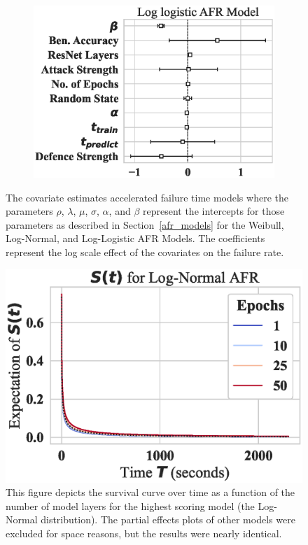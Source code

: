 \begin{figure}
\begin{subfigure}[t]{0.3\textwidth}
        \includegraphics[width=\textwidth]{cifar_log_logistic_aft.eps}
    \end{subfigure}

    \caption{The covariate estimates accelerated failure time models where the parameters $\rho$, $\lambda$, $\mu$, $\sigma$, $\alpha$, and $\beta$ represent the intercepts for those parameters as described in Section~\ref{afr_models} for the Weibull, Log-Normal, and Log-Logistic AFR Models. The coefficients represent the log scale effect of the covariates on the failure rate.}
    \label{fig:cifar_afr_models}
\end{figure}

\begin{figure}
    \centering\includegraphics[width=.5\textwidth]{cifar_log_normal_epochs_partial_effect.eps}
    \caption{This figure depicts the survival curve over time as a function of the number of model layers for the highest scoring model (the Log-Normal distribution). The partial effects plots of other models were excluded for space reasons, but the results were nearly identical.}
    \label{fig:cifar_layers}
\end{figure}


